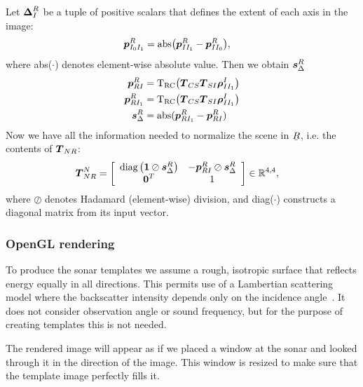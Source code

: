Let $\boldsymbol{\Delta}_I^R$ be a tuple of positive scalars that defines the extent of each axis in the image:
%
\begin{align}\label{eq:M}
\dvec{p}_{I_0I_1}^R &= \mathrm{abs}\big(\dvec{p}_{II_1}^R-\dvec{p}_{II_0}^R\big),
\end{align}
%
where abs($\cdot$) denotes element-wise absolute value. Then we obtain $\boldsymbol{s}_\Delta^R$
\begin{align}\label{eq:M}
\dvec{p}_{RI}^R   &= \mathrm{T_{RC}}\big(\mat{T}_{CS}\mat{T}_{SI}\dvec{\rho}_{II_1}^I\big) \\
\dvec{p}_{RI_1}^R &= \mathrm{T_{RC}}\big(\mat{T}_{CS}\mat{T}_{SI}\dvec{\rho}_{II_1}^I\big) \\
\dvec{s}_\Delta^R &= \mathrm{abs}(\dvec{p}_{RI_1}^R - \dvec{p}_{RI}^R)
\end{align}
%
Now we have all the information needed to normalize the scene in $\ubar{R}$, i.e. the contents of $\boldsymbol{T}_{NR}$:
%
\begin{align}
\dvec{T}_{NR}^N &= 
\left[\begin{array}{c c}
 \diag\left(\boldsymbol{1}\oslash\dvec{s}_\Delta^R\right)  & -\dvec{p}_{RI}^R\oslash\dvec{s}_\Delta^R \\%
 \dvec{0}^T  &  1
\end{array}\right] \in \mathbb{R}^{4,4}, \label{eq_T_NR}
\end{align}
%
where $\oslash$ denotes Hadamard (element-wise) division, and diag($\cdot$) constructs a diagonal matrix from its input vector. 



\subsubsection{OpenGL rendering}

To produce the sonar templates we assume a rough, isotropic surface that reflects energy equally in all directions. This permits use of a Lambertian scattering model where the backscatter intensity depends only on the incidence angle~\cite{Zhang1999}. It does not consider observation angle or sound frequency, but for the purpose of creating templates this is not needed.   

The rendered image will appear as if we placed a window at the sonar and looked through it in the direction of the image. This window is resized to make sure that the template image perfectly fills it.

